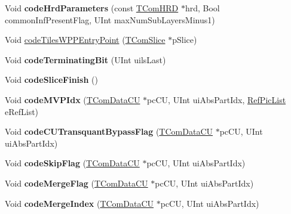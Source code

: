 \begin{DoxyCompactItemize}
Void {\bfseries code\+Hrd\+Parameters} (const \hyperlink{class_t_com_h_r_d}{T\+Com\+H\+RD} $\ast$hrd, Bool common\+Inf\+Present\+Flag, U\+Int max\+Num\+Sub\+Layers\+Minus1)
\item 
Void \hyperlink{class_t_enc_cavlc_a5cfa78fc37f6ef09bb2c48445fe75d7f}{code\+Tiles\+W\+P\+P\+Entry\+Point} (\hyperlink{class_t_com_slice}{T\+Com\+Slice} $\ast$p\+Slice)
\item 
\mbox{\label{class_t_enc_cavlc_aa007c0956c3a1f8dc8205e83aed807bd}} 
Void {\bfseries code\+Terminating\+Bit} (U\+Int uils\+Last)
\item 
\mbox{\label{class_t_enc_cavlc_a9d1c5e881d27f9f83135a85535438545}} 
Void {\bfseries code\+Slice\+Finish} ()
\item 
\mbox{\label{class_t_enc_cavlc_a5d44049f5c3e89013ad579354c136d08}} 
Void {\bfseries code\+M\+V\+P\+Idx} (\hyperlink{class_t_com_data_c_u}{T\+Com\+Data\+CU} $\ast$pc\+CU, U\+Int ui\+Abs\+Part\+Idx, \hyperlink{_type_def_8h_a93cea48eb9dcfd661168dee82e41b384}{Ref\+Pic\+List} e\+Ref\+List)
\item 
\mbox{\label{class_t_enc_cavlc_a951e7044005c19513ca1c60745472da1}} 
Void {\bfseries code\+C\+U\+Transquant\+Bypass\+Flag} (\hyperlink{class_t_com_data_c_u}{T\+Com\+Data\+CU} $\ast$pc\+CU, U\+Int ui\+Abs\+Part\+Idx)
\item 
\mbox{\label{class_t_enc_cavlc_a60df7435119e2b92a4f4b39ff44eeaef}} 
Void {\bfseries code\+Skip\+Flag} (\hyperlink{class_t_com_data_c_u}{T\+Com\+Data\+CU} $\ast$pc\+CU, U\+Int ui\+Abs\+Part\+Idx)
\item 
\mbox{\label{class_t_enc_cavlc_a505ea02f6062416ebd8a58fbb15b39f4}} 
Void {\bfseries code\+Merge\+Flag} (\hyperlink{class_t_com_data_c_u}{T\+Com\+Data\+CU} $\ast$pc\+CU, U\+Int ui\+Abs\+Part\+Idx)
\item 
\mbox{\label{class_t_enc_cavlc_a9eab0f75d9162e0bd7506e40df932b1a}} 
Void {\bfseries code\+Merge\+Index} (\hyperlink{class_t_com_data_c_u}{T\+Com\+Data\+CU} $\ast$pc\+CU, U\+Int ui\+Abs\+Part\+Idx)
\item 
\mbox{\label{class_t_enc_cavlc_ae61f94db7bb0024cd8f8fd473bc90d28}} 

\end{DoxyCompactItemize}
